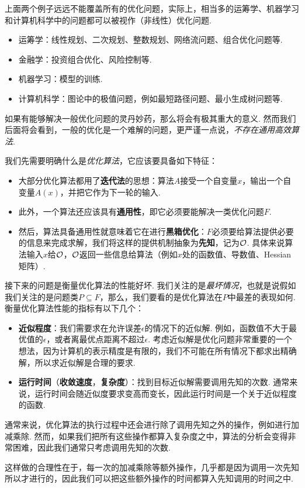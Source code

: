上面两个例子远远不能覆盖所有的优化问题，实际上，相当多的运筹学、机器学习和计算机科学中的问题都可以被视作（非线性）优化问题. 
\begin{itemize}
    \item 运筹学：线性规划、二次规划、整数规划、网络流问题、组合优化问题等.
    \item 金融学：投资组合优化、风险控制等.
    \item 机器学习：模型的训练.
    \item 计算机科学：图论中的极值问题，例如最短路径问题、最小生成树问题等.
\end{itemize}

如果有能够解决一般优化问题的灵丹妙药，那么将会有极其重大的意义. 然而我们后面将会看到，一般的优化是一个难解的问题，更严谨一点说，\textit{不存在通用高效算法}. 

我们先需要明确什么是\textit{优化算法}，它应该要具备如下特征：
\begin{itemize}
    \item 大部分优化算法都用了\textbf{迭代法}的思想：算法$A$接受一个自变量$x$，输出一个自变量$A(x)$，并把它作为下一轮的输入.
    \item 此外，一个算法还应该具有\textbf{通用性}，即它必须要能解决一类优化问题$F$.
    \item 然后，算法具备通用性就意味着它在进行\textbf{黑箱优化}：$F$必须要给算法提供必要的信息来完成求解，我们将这样的提供机制抽象为\textbf{先知}，记为$\mathcal{O}$. 具体来说算法输入$x$给$\mathcal{O}$，$\mathcal{O}$返回一些信息给算法（例如$x$处的函数值、导数值、Hessian矩阵）.
\end{itemize}

接下来的问题是衡量优化算法的性能好坏. 我们关注的是\textit{最坏情况}，也就是说假如我们关注的是问题类$P\subseteq F$，那么，我们要看的是优化算法在$P$中最差的表现如何. 衡量优化算法性能的指标有以下几个：

\begin{itemize}
    \item \textbf{近似程度}：我们需要求在允许误差$\epsilon$的情况下的近似解. 例如，函数值不大于最优值的$\epsilon$，或者离最优点距离不超过$\epsilon$. 考虑近似解是优化问题非常重要的一个想法，因为计算机的表示精度是有限的，我们不可能在所有情况下都求出精确解，所以求近似解是合理的要求. 
    \item \textbf{运行时间}（\textbf{收敛速度}，\textbf{复杂度}）：找到目标近似解需要调用先知的次数. 通常来说，运行时间会随近似度要求变高而变长，因此运行时间是一个关于近似程度的函数.
\end{itemize}

\begin{remark}
    通常来说，优化算法的执行过程中还会进行除了调用先知之外的操作，例如进行加减乘除. 然而，如果我们把所有这些操作都算入复杂度之中，算法的分析会变得非常困难，因此我们通常只考虑调用先知的次数. 
    
    这样做的合理性在于，每一次的加减乘除等额外操作，几乎都是因为调用一次先知所以才进行的，因此我们可以把这些额外操作的时间都算入先知调用的时间之中. 
\end{remark}

